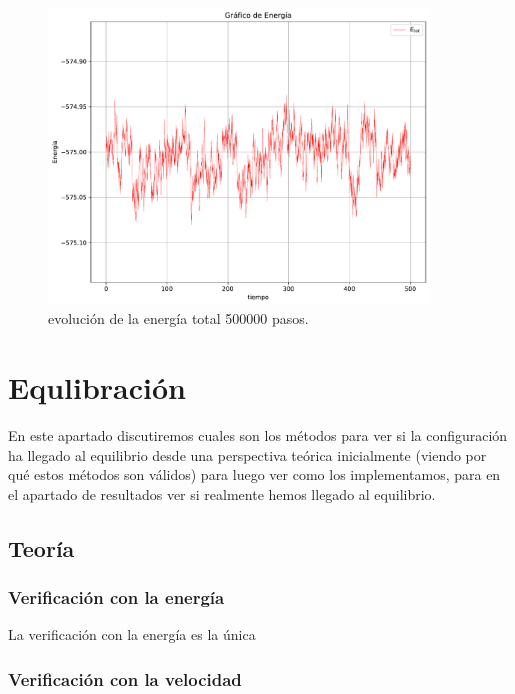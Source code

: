 \documentclass[11pt]{article} %
\begin{document}
\begin{figure}[h!] \centering
	\includegraphics[width=0.9\textwidth]{../../Graficas/Et-equilibra-500K.pdf}
	\caption{evolución de la energía total 500000 pasos.}
	\label{Fig:04}
\end{figure}	


\section{Equlibración}

En este apartado discutiremos cuales son los métodos para ver si la configuración ha llegado al equilibrio desde una perspectiva teórica inicialmente (viendo por qué estos métodos son válidos) para luego ver como los implementamos, para en el apartado de resultados ver si realmente hemos llegado al equilibrio. 

\subsection{Teoría}

\cite{Haile}

\subsubsection{Verificación con la energía}

La verificación con la energía es la única 


\subsubsection{Verificación con la velocidad}
\end{document}
